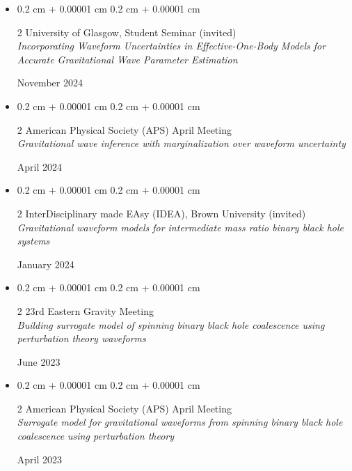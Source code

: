 \documentclass[10pt, letterpaper]{article}
\newenvironment{highlightsforbulletentries}{
    \begin{itemize}[
        topsep=0.10 cm,
        parsep=0.10 cm,
        partopsep=0pt,
        itemsep=0pt,
        leftmargin=10pt
    ]
}{
    \end{itemize}
}
\newenvironment{onecolentry}{
    \begin{adjustwidth}{
        0.2 cm + 0.00001 cm
    }{
        0.2 cm + 0.00001 cm
    }
}{
    \end{adjustwidth}
}
\newenvironment{twocolentry}[2][]{
    \onecolentry
    \def\secondColumn{#2}
    \setcolumnwidth{\fill, 3.5 cm}
    \begin{paracol}{2}
}{
    \switchcolumn \raggedleft \secondColumn
    \end{paracol}
    \endonecolentry
}
\begin{document}
\begin{highlightsforbulletentries}
  \item \begin{twocolentry}{November 2024}{University of Glasgow, Student Seminar (invited)}
    \\\textit{Incorporating Waveform Uncertainties in Effective-One-Body Models for Accurate Gravitational Wave Parameter Estimation}
  \end{twocolentry}
 
  \item \begin{twocolentry}{April 2024}{American Physical Society (APS) April Meeting}
    \\\textit{Gravitational wave inference with marginalization over waveform uncertainty}
  \end{twocolentry}
 
  \item \begin{twocolentry}{January 2024}{InterDisciplinary made EAsy (IDEA), Brown University (invited)}
    \\\textit{Gravitational waveform models for intermediate mass ratio binary black hole systems}
  \end{twocolentry}
 
  \item \begin{twocolentry}{June 2023}{23rd Eastern Gravity Meeting}
    \\\textit{Building surrogate model of spinning binary black hole coalescence using perturbation theory waveforms}
  \end{twocolentry}
 
  \item \begin{twocolentry}{April 2023}{American Physical Society (APS) April Meeting}
    \\\textit{Surrogate model for gravitational waveforms from spinning binary black hole coalescence using perturbation theory}
  \end{twocolentry}
\end{highlightsforbulletentries}
 
 
 
 
    
\end{document}

